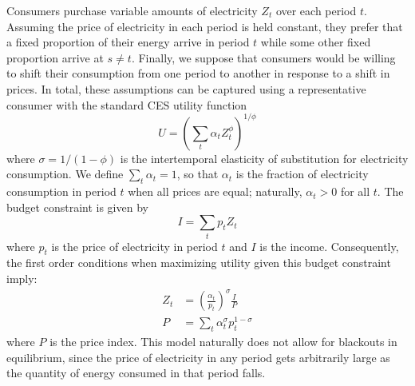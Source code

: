 \documentclass[11pt,a4paper]{extarticle}
\begin{document}
Consumers purchase variable amounts of electricity $Z_t$ over each period $t$. Assuming the price of electricity in each period is held constant, they prefer that a fixed proportion of their energy arrive in period $t$ while some other fixed proportion arrive at $s \neq t$. Finally, we suppose that consumers would be willing to shift their consumption from one period to another in response to a shift in prices. In total, these assumptions can be captured using a representative consumer with the standard CES utility function
\begin{equation}
U = \left( \sum_t \alpha_t Z_t^\phi  \right)^{1/\phi}
\end{equation}
where $\sigma = 1/(1-\phi)$ is the intertemporal elasticity of substitution for electricity consumption. We define $\sum_t \alpha_t = 1$, so that $\alpha_t$ is the fraction of electricity consumption in period $t$ when all prices are equal; naturally, $\alpha_t > 0$ for all $t$. The budget constraint is given by
\begin{equation}
I = \sum_t p_t Z_t
\end{equation}
where $p_t$ is the price of electricity in period $t$ and $I$ is the income. Consequently, the first order conditions when maximizing utility given this budget constraint imply:
\begin{align}
Z_t &= \left(\frac{\alpha_t}{p_t} \right)^\sigma \frac{I}{P} \\
P &= \sum_t \alpha_t^\sigma p_t^{1-\sigma}
\end{align}
where $P$ is the price index. This model naturally does not allow for blackouts in equilibrium, since the price of electricity in any period gets arbitrarily large as the quantity of energy consumed in that period falls. 
\end{document}
